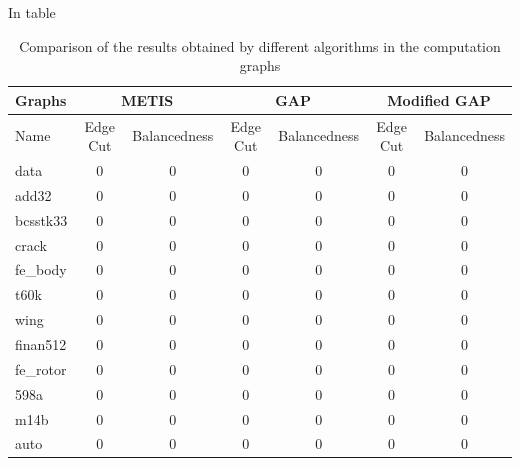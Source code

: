 In table 

\begin{table}
\centering
\begin{tabular}{ |p{1.75cm}||cc|cc|cc|  }
\hline
\hline
\textbf{Graphs} & \multicolumn{2}{c}{\textbf{METIS}} & \multicolumn{2}{c}{\textbf{GAP}} & \multicolumn{2}{c|}{\textbf{Modified GAP}} \\
\hline
\hline
Name & Edge Cut & Balancedness & Edge Cut & Balancedness & Edge Cut & Balancedness \\
\hline
data & 0 & 0 & 0 & 0 & 0 & 0  \\
add32 & 0 & 0 & 0 & 0 & 0 & 0  \\
bcsstk33 & 0 & 0 & 0 & 0 & 0 & 0  \\
crack & 0 & 0 & 0 & 0 & 0 & 0  \\
\hline
fe\_body & 0 & 0 & 0 & 0 & 0 & 0  \\
t60k & 0 & 0 & 0 & 0 & 0 & 0  \\
wing & 0 & 0 & 0 & 0 & 0 & 0  \\
finan512 & 0 & 0 & 0 & 0 & 0 & 0  \\
\hline
fe\_rotor & 0 & 0 & 0 & 0 & 0 & 0  \\
598a & 0 & 0 & 0 & 0 & 0 & 0  \\
m14b & 0 & 0 & 0 & 0 & 0 & 0  \\
auto & 0 & 0 & 0 & 0 & 0 & 0  \\
\hline
\end{tabular}
\caption{\label{tab:comp_graphs}Comparison of the results obtained by different algorithms in the computation graphs}
\end{table}



